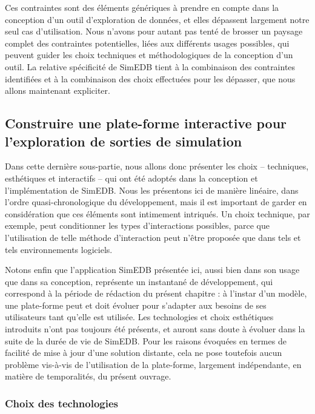 Ces contraintes sont des éléments génériques à prendre en compte dans la conception d'un outil d'exploration de données, et elles dépassent largement notre seul cas d'utilisation.
Nous n'avons pour autant pas tenté de brosser un paysage complet des contraintes potentielles, liées aux différents usages possibles, qui peuvent guider les choix techniques et méthodologiques de la conception d'un outil.
La relative spécificité de SimEDB tient à la combinaison des contraintes identifiées et à la combinaison des choix effectuées pour les dépasser, que nous allons maintenant expliciter.

\clearpage
\subsection{Construire une plate-forme interactive pour l'exploration de sorties de simulation}

Dans cette dernière sous-partie, nous allons donc présenter les choix -- techniques, esthétiques et interactifs -- qui ont été adoptés dans la conception et l'implémentation de SimEDB.
Nous les présentons ici de manière linéaire, dans l'ordre quasi-chronologique du développement, mais il est important de garder en considération que ces éléments sont intimement intriqués.
Un choix technique, par exemple, peut conditionner les types d'interactions possibles, parce que l'utilisation de telle méthode d'interaction peut n'être proposée que dans tels et tels environnements logiciels.

Notons enfin que l'application SimEDB présentée ici, aussi bien dans son usage que dans sa conception, représente un instantané de développement, qui correspond à la période de rédaction du présent chapitre :
à l'instar d'un modèle, une plate-forme peut et doit évoluer pour s'adapter aux besoins de ses utilisateurs tant qu'elle est utilisée.
Les technologies et choix esthétiques introduits n'ont pas toujours été présents, et auront sans doute à évoluer dans la suite de la \og durée de vie\fg{} de SimEDB.
Pour les raisons évoquées en termes de facilité de mise à jour d'une solution distante, cela ne pose toutefois aucun problème vis-à-vis de l'utilisation de la plate-forme, largement indépendante, en matière de temporalités, du présent ouvrage.

\subsubsection{Choix des technologies}

